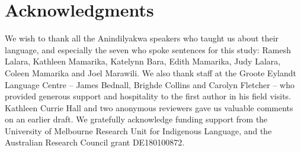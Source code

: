 \documentclass[output=paper,colorlinks,citecolor=brown]{langscibook}
\begin{document}
\section*{Acknowledgments}

We wish to thank all the Anindilyakwa speakers who taught us about their language, and especially the seven who spoke sentences for this study: Ramesh Lalara, Kathleen Mamarika, Katelynn Bara, Edith Mamarika, Judy Lalara, Coleen Mamarika and Joel Marawili. We also thank staff at the Groote Eylandt Language Centre \-– James Bednall, Brighde Collins and Carolyn Fletcher – who provided generous support and hospitality to the first author in his field visits. Kathleen Currie Hall and two anonymous reviewers gave us valuable comments on an earlier draft. We gratefully acknowledge funding support from the University of Melbourne Research Unit for Indigenous Language, and the Australian Research Council grant DE180100872.

\printbibliography[heading=subbibliography,notkeyword=this]
\end{document}
